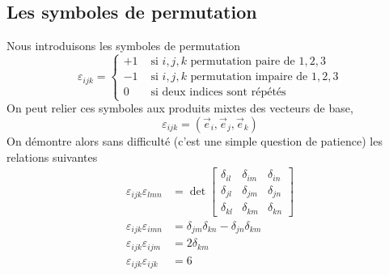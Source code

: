 \subsection{Les symboles de permutation}
Nous introduisons les symboles de permutation
\begin{equation}
    \varepsilon_{ijk} = 
    \begin{cases}
        +1 & \text{ si } i, j, k \text{ permutation paire de } 1, 2, 3\\
        -1 & \text{ si } i, j, k \text{ permutation impaire de } 1, 2, 3\\
        0 & \text{ si deux indices sont répétés}
    \end{cases}
    \label{eq:AnnA-033}
\end{equation}
On peut relier ces symboles aux produits mixtes des vecteurs de base,
\begin{equation}
    \varepsilon_{ijk} = \left( \vec{e}_i, \vec{e}_j, \vec{e}_k \right)
    \label{eq:AnnA-034}
\end{equation}
On démontre alors sans difficulté (c'est une simple question de patience) les relations suivantes
\begin{equation}
    \begin{aligned}
        \varepsilon_{ijk} \varepsilon_{lmn} &= \det
            \begin{bmatrix}
                \delta_{il} & \delta_{im} & \delta_{in} \\
                \delta_{jl} & \delta_{jm} & \delta_{jn} \\
                \delta_{kl} & \delta_{km} & \delta_{kn}
            \end{bmatrix}\\
            \varepsilon_{ijk} \varepsilon_{imn} &= \delta_{jm} \delta_{kn} - \delta_{jn} \delta_{km} \\
            \varepsilon_{ijk} \varepsilon_{ijm} &=2 \delta_{km} \\
            \varepsilon_{ijk} \varepsilon_{ijk} &= 6 
    \end{aligned}
    \label{eq:AnnA-035}
\end{equation}
